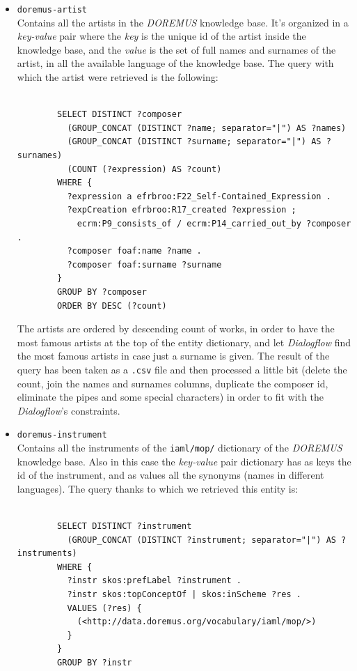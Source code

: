 \documentclass[a4paper,12pt]{report}
\begin{document}
	\begin{itemize}
		\item \texttt{doremus-artist}\\
		Contains all the artists in the \textit{DOREMUS} knowledge base. It's organized in a \textit{key-value} pair where the \textit{key} is the unique id of the artist inside the knowledge base, and the \textit{value} is the set of full names and surnames of the artist, in all the available language of the knowledge base.
		The query with which the artist were retrieved is the following:
		\begin{lstlisting}

		SELECT DISTINCT ?composer
		  (GROUP_CONCAT (DISTINCT ?name; separator="|") AS ?names)
		  (GROUP_CONCAT (DISTINCT ?surname; separator="|") AS ?surnames)
		  (COUNT (?expression) AS ?count)
		WHERE {
		  ?expression a efrbroo:F22_Self-Contained_Expression .
		  ?expCreation efrbroo:R17_created ?expression ;
		    ecrm:P9_consists_of / ecrm:P14_carried_out_by ?composer .
		  ?composer foaf:name ?name .
		  ?composer foaf:surname ?surname 
		}
		GROUP BY ?composer
		ORDER BY DESC (?count)
		\end{lstlisting}
		The artists are ordered by descending count of works, in order to have the most famous artists at the top of the entity dictionary, and let \textit{Dialogflow} find the most famous artists in case just a surname is given. The result of the query has been taken as a \texttt{.csv} file and then processed a little bit (delete the count, join the names and surnames columns, duplicate the composer id, eliminate the pipes and some special characters) in order to fit with the \textit{Dialogflow}'s constraints.
		
		\item \texttt{doremus-instrument}\\
		Contains all the instruments of the \texttt{iaml/mop/} dictionary of the \textit{DOREMUS} knowledge base. Also in this case the \textit{key-value} pair dictionary has as keys the id of the instrument, and as values all the synonyms (names in different languages). The query thanks to which we retrieved this entity is:
		\begin{lstlisting}
		
		SELECT DISTINCT ?instrument
		  (GROUP_CONCAT (DISTINCT ?instrument; separator="|") AS ?instruments)
		WHERE {
		  ?instr skos:prefLabel ?instrument .
		  ?instr skos:topConceptOf | skos:inScheme ?res .
		  VALUES (?res) {
		    (<http://data.doremus.org/vocabulary/iaml/mop/>)
		  }
		}
		GROUP BY ?instr
		\end{lstlisting}
		

\end{itemize}
\end{document}
